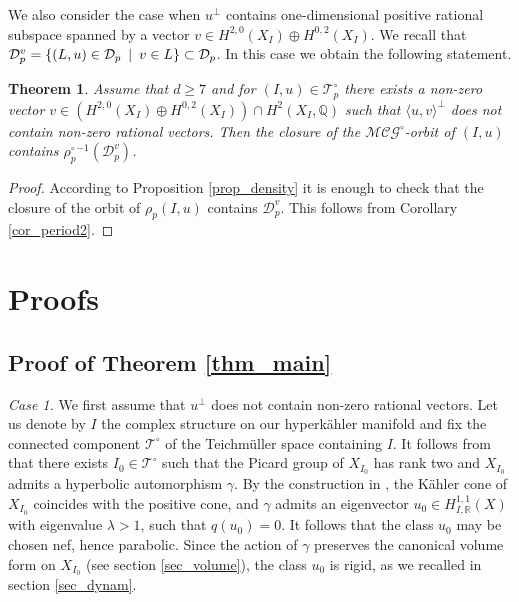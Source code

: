 \documentclass[11pt]{article}
\newcommand{\6}{\partial}
\newcommand{\bbQ}{\mathbb{Q}}
\newcommand{\bbR}{\mathbb{R}}
\renewcommand{\ge}{\geqslant}
\newcommand{\st}{\enskip |\enskip}
\newcommand{\Teich}{\mathcal{T}}
\newcommand{\TeichP}{\Teich_p}
\newcommand{\MC}{\mathcal{MCG}}
\newcommand{\Dom}{\mathcal{D}}
\newcommand{\DomP}{\Dom_p}
\newcommand{\Per}{\rho}
\newcommand{\PerP}{\Per_p}
\newtheorem{thm}[defn]{Theorem}
\begin{document}
We also consider the case when $u^\perp$ contains one-dimensional positive rational subspace
spanned by a vector $v\in H^{2,0}(X_I)\oplus H^{0,2}(X_I)$. We recall that
$\DomP^v = \{(L,u)\in \DomP\st v\in L\}\subset \DomP$.
In this case we obtain the following statement.

\begin{thm}\label{thm_orbit_closure}
Assume that $d\ge 7$ and for $(I,u)\in \TeichP^\circ$ there exists a non-zero vector
$v\in (H^{2,0}(X_I)\oplus H^{0,2}(X_I))\cap H^2(X_I,\bbQ)$ such that
$\langle u,v\rangle^\perp$ does not contain non-zero rational vectors.
Then the closure of the $\MC^\circ$-orbit of $(I,u)$ contains ${\PerP^{\circ}}^{-1}(\DomP^v)$.
\end{thm}
\begin{proof}
According to Proposition \ref{prop_density} it is enough to check that the closure of the orbit 
of $\PerP(I,u)$ contains $\DomP^v$. This follows from Corollary \ref{cor_period2}.
\end{proof}

\section{Proofs}

\subsection{Proof of Theorem \ref{thm_main}}\label{sec_main_proof}

{\em Case 1.} We first assume that $u^\perp$ does not contain non-zero rational vectors.
Let us denote by $I$ the complex structure on our hyperk\"ahler manifold and
fix the connected component $\Teich^\circ$ of the Teichm\"uller space containing $I$. It follows from \cite[Theorem 1.1]{AV2}
that there exists $I_0\in \Teich^\circ$ such that the Picard group of $X_{I_0}$ has rank two
and $X_{I_0}$ admits a hyperbolic automorphism $\gamma$. By the construction in \cite{AV2},
the K\"ahler cone of $X_{I_0}$ coincides with the positive cone, and $\gamma$ admits
an eigenvector $u_0\in H^{1,1}_{I,\bbR}(X)$ with eigenvalue $\lambda > 1$, such that
$q(u_0) = 0$. It follows that the class $u_0$ may be chosen nef, hence parabolic.
Since the action of $\gamma$ preserves the canonical volume form on $X_{I_0}$ (see section \ref{sec_volume}),
the class $u_0$ is rigid, as we recalled in section \ref{sec_dynam}.
\end{document}
